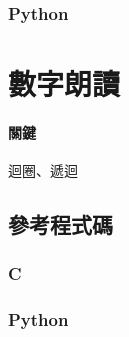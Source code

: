 \documentclass[a4paper,10pt]{article}
\begin{document}


\subsubsection{Python}



\section{數字朗讀}

\paragraph{關鍵} 迴圈、遞迴

\subsection{參考程式碼}

\subsubsection{C}



\subsubsection{Python}


\end{document}

